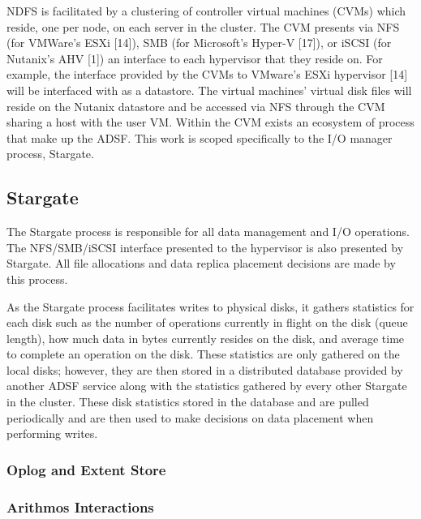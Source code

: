 \documentclass[12pt]{article}
\begin{document}
  NDFS is facilitated by a clustering of controller virtual machines (CVMs)
  which reside, one per node, on each server in the cluster. The CVM presents
  via NFS (for VMWare's ESXi [14]), SMB (for Microsoft's Hyper-V [17]), or
  iSCSI (for Nutanix's AHV [1]) an interface to each hypervisor that they
  reside on. For example, the interface provided by the CVMs to VMware's ESXi
  hypervisor [14] will be interfaced with as a datastore. The virtual machines'
  virtual disk files will reside on the Nutanix datastore and be accessed via
  NFS through the CVM sharing a host with the user VM. Within the CVM exists an
  ecosystem of process that make up the ADSF. This work is scoped specifically
  to the I/O manager process, Stargate.


  \subsection{Stargate}

  The Stargate process is responsible for all data management and I/O
  operations. The NFS/SMB/iSCSI interface presented to the hypervisor is also
  presented by Stargate. All file allocations and data replica placement
  decisions are made by this process.

  As the Stargate process facilitates writes to physical disks, it gathers
  statistics for each disk such as the number of operations currently in flight
  on the disk (queue length), how much data in bytes currently resides on the
  disk, and average time to complete an operation on the disk. These statistics
  are only gathered on the local disks; however, they are then stored in a
  distributed database provided by another ADSF service along with the
  statistics gathered by every other Stargate in the cluster. These disk
  statistics stored in the database and are pulled periodically and are then
  used to make decisions on data placement when performing writes.

    \subsubsection{Oplog and Extent Store}


    \subsubsection{Arithmos Interactions}

\end{document}
